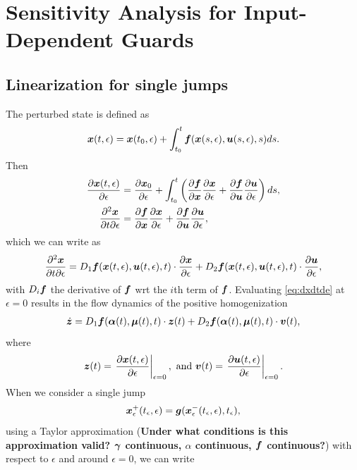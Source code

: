 \documentclass[../DC2017114Bouma.tex]{subfiles}
\begin{document}
\cleartooddpage
\chapter{Sensitivity Analysis for Input-Dependent Guards}
\section{Linearization for single jumps}
The perturbed state is defined as
\begin{align}
{\boldsymbol{x}}(t,\epsilon) = {\boldsymbol{x}}(t_0,\epsilon) + \int_{t_0}^{t}{\boldsymbol{f}}({\boldsymbol{x}}(s,\epsilon),{\boldsymbol{u}}(s,\epsilon),s)ds.
\end{align}
Then
\begin{align}
\frac{\partial{\boldsymbol{x}}(t,\epsilon)}{\partial\epsilon} &= \frac{\partial{\boldsymbol{x}}_0}{\partial\epsilon} + \int_{t_0}^{t}\left(\frac{\partial{\boldsymbol{f}}}{\partial{\boldsymbol{x}}}\frac{\partial{\boldsymbol{x}}}{\partial\epsilon} + \frac{\partial{\boldsymbol{f}}}{\partial{\boldsymbol{u}}}\frac{\partial{\boldsymbol{u}}}{\partial\epsilon}\right)ds,\\
\frac{\partial^2{\boldsymbol{x}}}{\partial t\partial\epsilon} &= \frac{\partial{\boldsymbol{f}}}{\partial{\boldsymbol{x}}}\frac{\partial{\boldsymbol{x}}}{\partial\epsilon} + \frac{\partial{\boldsymbol{f}}}{\partial{\boldsymbol{u}}}\frac{\partial{\boldsymbol{u}}}{\partial\epsilon},
\end{align}
which we can write as
\begin{align}
\frac{\partial^2{\boldsymbol{x}}}{\partial t\partial\epsilon} = D_1{\boldsymbol{f}}({\boldsymbol{x}}(t,\epsilon),{\boldsymbol{u}}(t,\epsilon),t)\cdot \frac{\partial{\boldsymbol{x}}}{\partial\epsilon} + D_2{\boldsymbol{f}}({\boldsymbol{x}}(t,\epsilon),{\boldsymbol{u}}(t,\epsilon),t)\cdot \frac{\partial{\boldsymbol{u}}}{\partial\epsilon}, \label{eq:dxdtde}
\end{align}
with $D_i{\boldsymbol{f}}$ the derivative of ${\boldsymbol{f}}$ wrt the $i$th term of ${\boldsymbol{f}}$. Evaluating \eqref{eq:dxdtde} at $\epsilon = 0$ results in the flow dynamics of the positive homogenization
\begin{align}
\dot{{\boldsymbol{z}}} = D_1{\boldsymbol{f}}(\boldsymbol{\alpha}(t),\boldsymbol{\mu}(t),t)\cdot {\boldsymbol{z}}(t) + D_2{\boldsymbol{f}}(\boldsymbol{\alpha}(t),\boldsymbol{\mu}(t),t)\cdot {\boldsymbol{v}}(t),
\end{align}
where 
\begin{align}
{\boldsymbol{z}}(t) = \left.\frac{\partial{\boldsymbol{x}}(t,\epsilon)}{\partial\epsilon}\right|_{\epsilon=0},\text{ and } {\boldsymbol{v}}(t) = \left.\frac{\partial{\boldsymbol{u}}(t,\epsilon)}{\partial\epsilon}\right|_{\epsilon=0} .
\end{align}
When we consider a single jump
\begin{align}
{\boldsymbol{x}}^{+}_\epsilon(t_\epsilon,\epsilon) = {\boldsymbol{g}}({\boldsymbol{x}}^{-}_\epsilon(t_\epsilon,\epsilon),t_\epsilon),\label{eq:g}
\end{align}
using a Taylor approximation (\textbf{Under what conditions is this approximation valid? $\boldsymbol{\gamma}$ continuous, $\alpha$ continuous, ${\boldsymbol{f}}$ continuous?}) with respect to $\epsilon$ and around $\epsilon = 0$, we can write
\end{document}
